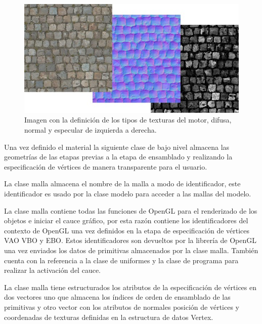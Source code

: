 \documentclass[a4paper, 17pt]{book}
\begin{document}
\begin{figure}[H]
    \centering
    \includegraphics[scale=0.45, keepaspectratio]{img/custom-textures.jpg}
    \caption{Imagen con la definición de los tipos de texturas del motor, difusa, normal y especular de izquierda a derecha.}
    \label{figura:Texture}
\end{figure}

Una vez definido el material la siguiente clase de bajo nivel almacena las geometrías de las etapas previas a la etapa de ensamblado y
realizando la especificación de vértices de manera transparente para el usuario.

\vspace{1mm} %

La clase malla almacena el nombre de la malla a modo de identificador, este identificador es usado por la clase modelo para acceder
a las mallas del modelo. 

\vspace{1mm} %

La clase malla contiene todas las funciones de OpenGL para el renderizado de los objetos e iniciar el cauce gráfico, por esta razón
contiene los identificadores del contexto de OpenGL una vez definidos en la etapa de especificación de vértices VAO VBO y EBO. Estos
identificadores son devueltos por la librería de OpenGL una vez enviados los datos de primitivas almacenados por la clase malla.
También cuenta con la referencia a la clase de uniformes y la clase de programa para realizar la activación del cauce.

\vspace{1mm} %

La clase malla tiene estructurados los atributos de la especificación de vértices en dos vectores uno que almacena los índices de
orden de ensamblado de las primitivas y otro vector con los atributos de normales posición de vértices y coordenadas de texturas
definidas en la estructura de datos Vertex.
\end{document}
